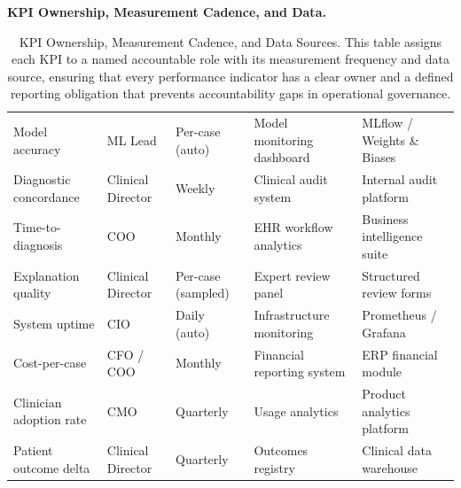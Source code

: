 \noindent\textbf{KPI Ownership, Measurement Cadence, and Data.}

\begin{table}[!htbp]
\tablestripes\tablefontsize
\tablefontsize
\caption[KPI Ownership, Measurement Cadence, and Data Sources]{KPI Ownership, Measurement Cadence, and Data Sources. This table assigns each KPI to a named accountable role with its measurement frequency and data source, ensuring that every performance indicator has a clear owner and a defined reporting obligation that prevents accountability gaps in operational governance.}
\begin{tabularx}{\textwidth}{@{} >{\raggedright\arraybackslash}p{2.0cm} >{\raggedright\arraybackslash}p{1.6cm} >{\raggedright\arraybackslash}p{1.6cm} L L @{}}
\toprule
{} &  &  &  &  \\
\midrule
Model accuracy & ML Lead & Per-case (auto) & Model monitoring dashboard & MLflow / Weights \& Biases \\
\addlinespace
Diagnostic concordance & Clinical Director & Weekly & Clinical audit system & Internal audit platform \\
\addlinespace
Time-to-diagnosis & COO & Monthly & EHR workflow analytics & Business intelligence suite \\
\addlinespace
Explanation quality & Clinical Director & Per-case (sampled) & Expert review panel & Structured review forms \\
\addlinespace
System uptime & CIO & Daily (auto) & Infrastructure monitoring & Prometheus / Grafana \\
\addlinespace
Cost-per-case & CFO / COO & Monthly & Financial reporting system & ERP financial module \\
\addlinespace
Clinician adoption rate & CMO & Quarterly & Usage analytics & Product analytics platform \\
\addlinespace
Patient outcome delta & Clinical Director & Quarterly & Outcomes registry & Clinical data warehouse \\
\bottomrule
\end{tabularx}
\end{table}

